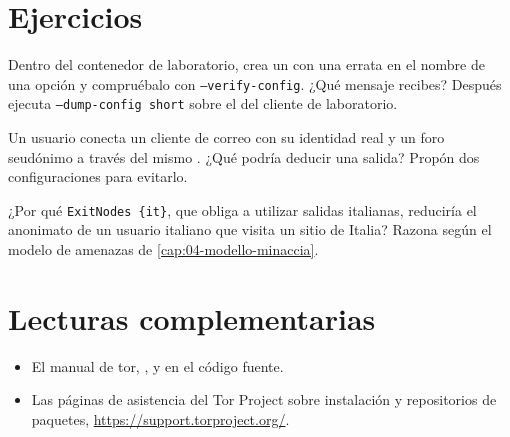 \section*{Ejercicios}

\begin{esercizio}[1]\label{es:17-verifica}
Dentro del contenedor de laboratorio, crea un  con una errata en el nombre de una opción y compruébalo con \texttt{--verify-config}. ¿Qué mensaje recibes? Después ejecuta \texttt{--dump-config short} sobre el  del cliente de laboratorio.
\end{esercizio}

\begin{esercizio}[2]\label{es:17-isolamento}
Un usuario conecta un cliente de correo con su identidad real y un foro seudónimo a través del mismo . ¿Qué podría deducir una salida? Propón dos configuraciones para evitarlo.
\end{esercizio}

\begin{esercizio}[2]\label{es:17-exitnodes}
¿Por qué \texttt{ExitNodes \{it\}}, que obliga a utilizar salidas italianas, reduciría el anonimato de un usuario italiano que visita un sitio de Italia? Razona según el modelo de amenazas de \cref{cap:04-modello-minaccia}.
\end{esercizio}

\section*{Lecturas complementarias}
\begin{itemize}
  \item El manual de tor, , y  en el código fuente.
  \item Las páginas de asistencia del Tor Project sobre instalación y repositorios de paquetes, \url{https://support.torproject.org/}.
\end{itemize}

